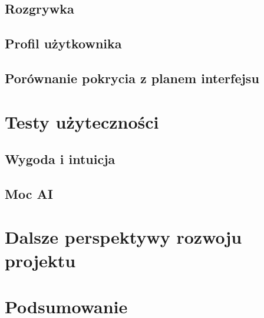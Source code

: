 \subsection{Rozgrywka}

\subsection{Profil użytkownika}

\subsection{Porównanie pokrycia z planem interfejsu}


\section{Testy użyteczności}

\subsection{Wygoda i intuicja}
\subsection{Moc AI}


\section{Dalsze perspektywy rozwoju projektu}

\section{Podsumowanie}


